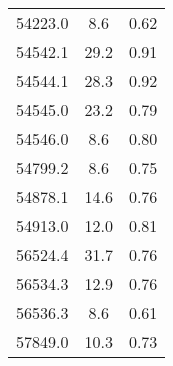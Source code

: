 \documentclass{aa}
\begin{document}
\begin{appendix}
\begin{table}
\begin{tabular}{c c c}
54223.0 &  8.6 & 0.62\\
54542.1 & 29.2 & 0.91\\
54544.1 & 28.3 & 0.92\\
54545.0 & 23.2 & 0.79\\
54546.0 &  8.6 & 0.80\\
54799.2 &  8.6 & 0.75\\
54878.1 & 14.6 & 0.76\\
54913.0 & 12.0 & 0.81\\
56524.4 & 31.7 & 0.76\\
56534.3 & 12.9 & 0.76\\
56536.3 &  8.6 & 0.61\\
57849.0 & 10.3 & 0.73\\
\end{tabular}
\end{table}

\end{appendix}
\end{document}
